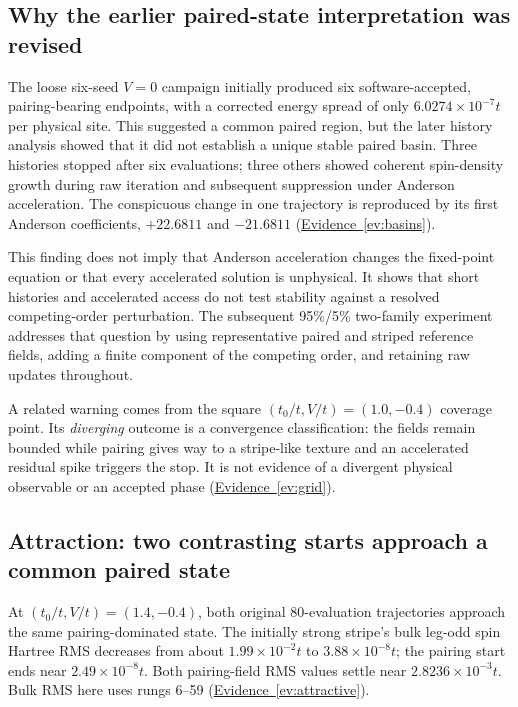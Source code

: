 \documentclass[11pt,letterpaper]{article}
\newcommand{\ev}[1]{\hyperref[ev:#1]{Evidence~\ref*{ev:#1}}}
\begin{document}
\subsection{Why the earlier paired-state interpretation was revised}

The loose six-seed $V=0$ campaign initially produced six software-accepted,
pairing-bearing endpoints, with a corrected energy spread of only
$6.0274\times10^{-7}t$ per physical site. This suggested a common paired
region, but the later history analysis showed that it did not establish
a unique stable paired basin. Three histories stopped after six evaluations;
three others showed coherent spin-density growth during raw iteration and
subsequent suppression under Anderson acceleration. The conspicuous change
in one trajectory is reproduced by its first Anderson coefficients,
$+22.6811$ and $-21.6811$ (\ev{basins}).

This finding does not imply that Anderson acceleration changes the
fixed-point equation or that every accelerated solution is unphysical.
It shows that short histories and accelerated access do not test stability
against a resolved competing-order perturbation. The subsequent 95\%/5\%
two-family experiment addresses that question by using representative paired
and striped reference fields, adding a finite component of the competing
order, and retaining raw updates throughout.

A related warning comes from the square $(t_0/t,V/t)=(1.0,-0.4)$ coverage
point. Its \emph{diverging} outcome is a convergence classification: the fields
remain bounded while pairing gives way to a stripe-like texture and an
accelerated residual spike triggers the stop. It is not evidence of a
divergent physical observable or an accepted phase (\ev{grid}).

\subsection{Attraction: two contrasting starts approach a common paired state}
\label{sec:attraction}

At $(t_0/t,V/t)=(1.4,-0.4)$, both original 80-evaluation trajectories approach
the same pairing-dominated state. The initially strong stripe's bulk
leg-odd spin Hartree RMS decreases from about $1.99\times10^{-2}t$ to
$3.88\times10^{-8}t$; the pairing start ends near $2.49\times10^{-8}t$.
Both pairing-field RMS values settle near $2.8236\times10^{-3}t$.
Bulk RMS here uses rungs 6--59 (\ev{attractive}).
\end{document}
